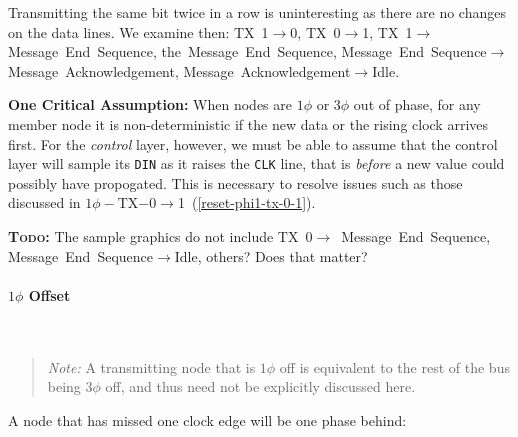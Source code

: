 Transmitting the same bit twice in a row is uninteresting as there are no
changes on the data lines. We examine then: TX~1$\rightarrow$0,
TX~0$\rightarrow$1, TX~1$\rightarrow$Message~End~Sequence,
the~Message~End~Sequence,
Message~End~Sequence$\rightarrow$Message~Acknowledgement,
Message~Acknowledgement$\rightarrow$Idle.

\medskip
\noindent
\begin{framed}
  \label{reset-assumption}
  \textbf{One Critical Assumption:} When nodes are $1\phi$ or $3\phi$ out of
  phase, for any member node it is non-deterministic if the new data or the
  rising clock arrives first. For the {\em control} layer, however, we must
  be able to assume that the control layer will sample its {\tt DIN} as it
  raises the {\tt CLK} line, that is {\em before} a new value could possibly
  have propogated.  This is necessary to resolve issues such as those discussed
  in $1\phi-$TX$-0\rightarrow$1~(\ref{reset-phi1-tx-0-1}).
\end{framed}

\medskip
\textbf{\textsc{Todo:}} The sample graphics do not include
TX~0$\rightarrow$~Message~End~Sequence, Message~End~Sequence$\rightarrow$Idle,
others? Does that matter?

\paragraph{$1\phi$ Offset}
~

\begin{quote}
{\em Note:} A transmitting node that is $1\phi$ off is equivalent to the rest
of the bus being $3\phi$ off, and thus need not be explicitly discussed here.
\end{quote}

A node that has missed one clock edge will be one phase behind:

